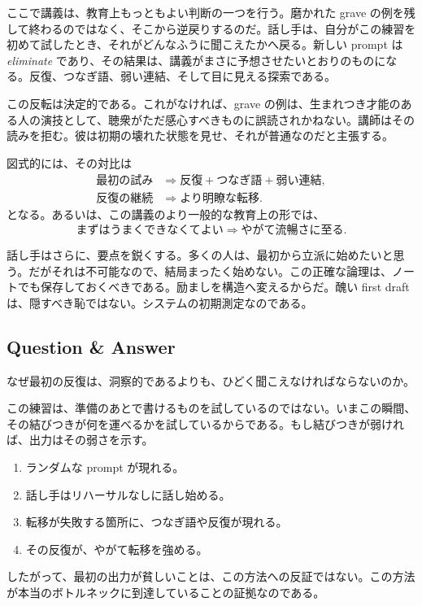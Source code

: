 ここで講義は、教育上もっともよい判断の一つを行う。磨かれた grave の例を残して終わるのではなく、そこから逆戻りするのだ。話し手は、自分がこの練習を初めて試したとき、それがどんなふうに聞こえたかへ戻る。新しい prompt は \emph{eliminate} であり、その結果は、講義がまさに予想させたいとおりのものになる。反復、つなぎ語、弱い連結、そして目に見える探索である。

この反転は決定的である。これがなければ、grave の例は、生まれつき才能のある人の演技として、聴衆がただ感心すべきものに誤読されかねない。講師はその読みを拒む。彼は初期の壊れた状態を見せ、それが普通なのだと主張する。

図式的には、その対比は
\begin{align}
\text{最初の試み} &\Longrightarrow \text{反復} + \text{つなぎ語} + \text{弱い連結},\\
\text{反復の継続} &\Longrightarrow \text{より明瞭な転移}.
\end{align}
となる。あるいは、この講義のより一般的な教育上の形では、
\begin{equation}
\text{まずはうまくできなくてよい} \Longrightarrow \text{やがて流暢さに至る}.
\end{equation}

話し手はさらに、要点を鋭くする。多くの人は、最初から立派に始めたいと思う。だがそれは不可能なので、結局まったく始めない。この正確な論理は、ノートでも保存しておくべきである。励ましを構造へ変えるからだ。醜い first draft は、隠すべき恥ではない。システムの初期測定なのである。

\subsection{Question \& Answer}

なぜ最初の反復は、洞察的であるよりも、ひどく聞こえなければならないのか。

この練習は、準備のあとで書けるものを試しているのではない。いまこの瞬間、その結びつきが何を運べるかを試しているからである。もし結びつきが弱ければ、出力はその弱さを示す。
\begin{enumerate}
\item ランダムな prompt が現れる。
\item 話し手はリハーサルなしに話し始める。
\item 転移が失敗する箇所に、つなぎ語や反復が現れる。
\item その反復が、やがて転移を強める。
\end{enumerate}
したがって、最初の出力が貧しいことは、この方法への反証ではない。この方法が本当のボトルネックに到達していることの証拠なのである。

